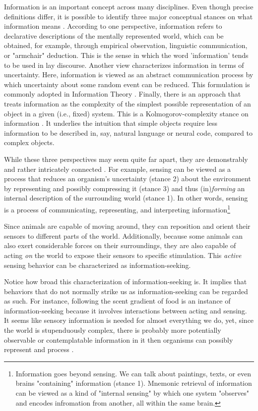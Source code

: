 Information is an important concept across many disciplines. Even though precise definitions differ, it is possible to identify three major conceptual stances on what information means \cite{adriaans_introduction_2008}. According to one perspective, information refers to declarative descriptions of the mentally represented world, which can be obtained, for example, through empirical observation, linguistic communication, or "armchair" deduction. This is the sense in which the word 'information' tends to be used in lay discourse. Another view characterizes information in terms of uncertainty. Here, information is viewed as an abstract communication process by which uncertainty about some random event can be reduced. This formulation is commonly adopted in Information Theory \cite{shannon_mathematical_1948}. Finally, there is an approach that treats information as the complexity of the simplest possible representation of an object in a given (i.e., fixed) system. This is a Kolmogorov-complexity stance on information \cite{kolmogorov1965three}. It underlies the intuition that simple objects require less information to be described in, say, natural language or neural code, compared to complex objects.

While these three perspectives may seem quite far apart, they are demonstrably and rather intricately connected \cite{adriaans_introduction_2008}. For example, sensing can be viewed as a process that reduces an organism's uncertainty (stance 2) about the environment by representing and possibly compressing it (stance 3) and thus (in)\emph{forming} an internal description of the surrounding world (stance 1). In other words, sensing is a process of communicating, representing, and interpreting information\footnote{Information goes beyond sensing. We can talk about paintings, texts, or even brains "containing" information (stance 1). Mnemonic retrieval of information can be viewed as a kind of "internal sensing" by which one system "observes" and encodes infromation from another, all within the same brain.}

Since animals are capable of moving around, they can reposition and orient their sensors to different parts of the world. Additionally, because some animals can also exert considerable forces on their surroundings, they are also capable of acting \emph{on} the world to expose their sensors to specific stimulation. This \emph{active} sensing behavior can be characterized as information-seeking. 

Notice how broad this characterization of information-seeking is. It implies that behaviors that do not normally strike us as information-seeking can be regarded as such. For instance, following the scent gradient of food is an instance of information-seeking because it involves interactions between acting and sensing. It seems like sensory information is needed for almost everything we do, yet, since the world is stupenduously complex, there is probably more potentially observable or contemplatable information in it then organisms can possibly represent and process \cite{kolmogorov1965three}. 

